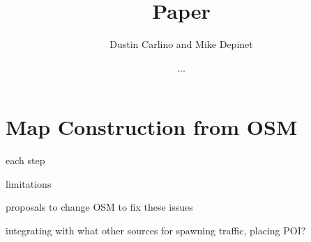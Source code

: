 \documentclass[12pt]{article}
\title{Paper}
\author{Dustin Carlino and Mike Depinet}
\date{...}
\begin{document}
\maketitle


\section{Map Construction from OSM}

each step

limitations

proposals to change OSM to fix these issues

integrating with what other sources for spawning traffic, placing POI?
\end{document}
